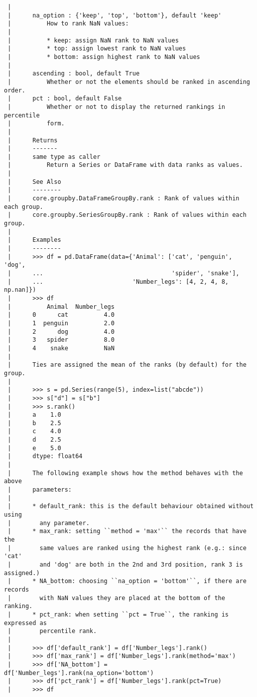 \documentclass[
  letterpaper,
  DIV=11,
  numbers=noendperiod]{scrreprt}
\begin{document}
\begin{verbatim}
 |      
 |      na_option : {'keep', 'top', 'bottom'}, default 'keep'
 |          How to rank NaN values:
 |      
 |          * keep: assign NaN rank to NaN values
 |          * top: assign lowest rank to NaN values
 |          * bottom: assign highest rank to NaN values
 |      
 |      ascending : bool, default True
 |          Whether or not the elements should be ranked in ascending order.
 |      pct : bool, default False
 |          Whether or not to display the returned rankings in percentile
 |          form.
 |      
 |      Returns
 |      -------
 |      same type as caller
 |          Return a Series or DataFrame with data ranks as values.
 |      
 |      See Also
 |      --------
 |      core.groupby.DataFrameGroupBy.rank : Rank of values within each group.
 |      core.groupby.SeriesGroupBy.rank : Rank of values within each group.
 |      
 |      Examples
 |      --------
 |      >>> df = pd.DataFrame(data={'Animal': ['cat', 'penguin', 'dog',
 |      ...                                    'spider', 'snake'],
 |      ...                         'Number_legs': [4, 2, 4, 8, np.nan]})
 |      >>> df
 |          Animal  Number_legs
 |      0      cat          4.0
 |      1  penguin          2.0
 |      2      dog          4.0
 |      3   spider          8.0
 |      4    snake          NaN
 |      
 |      Ties are assigned the mean of the ranks (by default) for the group.
 |      
 |      >>> s = pd.Series(range(5), index=list("abcde"))
 |      >>> s["d"] = s["b"]
 |      >>> s.rank()
 |      a    1.0
 |      b    2.5
 |      c    4.0
 |      d    2.5
 |      e    5.0
 |      dtype: float64
 |      
 |      The following example shows how the method behaves with the above
 |      parameters:
 |      
 |      * default_rank: this is the default behaviour obtained without using
 |        any parameter.
 |      * max_rank: setting ``method = 'max'`` the records that have the
 |        same values are ranked using the highest rank (e.g.: since 'cat'
 |        and 'dog' are both in the 2nd and 3rd position, rank 3 is assigned.)
 |      * NA_bottom: choosing ``na_option = 'bottom'``, if there are records
 |        with NaN values they are placed at the bottom of the ranking.
 |      * pct_rank: when setting ``pct = True``, the ranking is expressed as
 |        percentile rank.
 |      
 |      >>> df['default_rank'] = df['Number_legs'].rank()
 |      >>> df['max_rank'] = df['Number_legs'].rank(method='max')
 |      >>> df['NA_bottom'] = df['Number_legs'].rank(na_option='bottom')
 |      >>> df['pct_rank'] = df['Number_legs'].rank(pct=True)
 |      >>> df

\end{verbatim}
\end{document}
